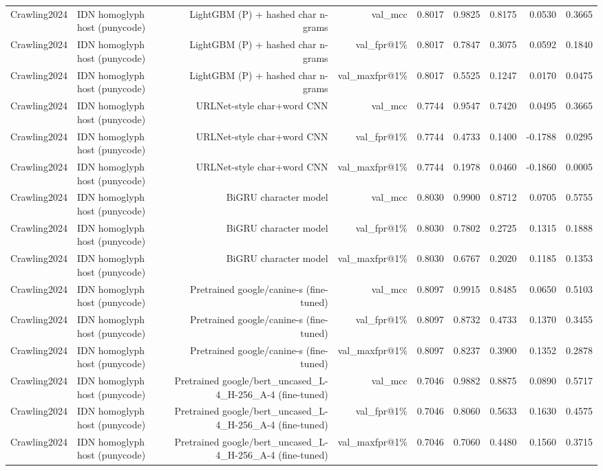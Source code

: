 \begin{table}[t]
\begin{tabular}{llrrrrrrr}
Crawling2024 & IDN homoglyph host (punycode) & LightGBM (P) + hashed char n-grams & val\_mcc & 0.8017 & 0.9825 & 0.8175 & 0.0530 & 0.3665 \\
Crawling2024 & IDN homoglyph host (punycode) & LightGBM (P) + hashed char n-grams & val\_fpr@1\% & 0.8017 & 0.7847 & 0.3075 & 0.0592 & 0.1840 \\
Crawling2024 & IDN homoglyph host (punycode) & LightGBM (P) + hashed char n-grams & val\_maxfpr@1\% & 0.8017 & 0.5525 & 0.1247 & 0.0170 & 0.0475 \\
Crawling2024 & IDN homoglyph host (punycode) & URLNet-style char+word CNN & val\_mcc & 0.7744 & 0.9547 & 0.7420 & 0.0495 & 0.3665 \\
Crawling2024 & IDN homoglyph host (punycode) & URLNet-style char+word CNN & val\_fpr@1\% & 0.7744 & 0.4733 & 0.1400 & -0.1788 & 0.0295 \\
Crawling2024 & IDN homoglyph host (punycode) & URLNet-style char+word CNN & val\_maxfpr@1\% & 0.7744 & 0.1978 & 0.0460 & -0.1860 & 0.0005 \\
Crawling2024 & IDN homoglyph host (punycode) & BiGRU character model & val\_mcc & 0.8030 & 0.9900 & 0.8712 & 0.0705 & 0.5755 \\
Crawling2024 & IDN homoglyph host (punycode) & BiGRU character model & val\_fpr@1\% & 0.8030 & 0.7802 & 0.2725 & 0.1315 & 0.1888 \\
Crawling2024 & IDN homoglyph host (punycode) & BiGRU character model & val\_maxfpr@1\% & 0.8030 & 0.6767 & 0.2020 & 0.1185 & 0.1353 \\
Crawling2024 & IDN homoglyph host (punycode) & Pretrained google/canine-s (fine-tuned) & val\_mcc & 0.8097 & 0.9915 & 0.8485 & 0.0650 & 0.5103 \\
Crawling2024 & IDN homoglyph host (punycode) & Pretrained google/canine-s (fine-tuned) & val\_fpr@1\% & 0.8097 & 0.8732 & 0.4733 & 0.1370 & 0.3455 \\
Crawling2024 & IDN homoglyph host (punycode) & Pretrained google/canine-s (fine-tuned) & val\_maxfpr@1\% & 0.8097 & 0.8237 & 0.3900 & 0.1352 & 0.2878 \\
Crawling2024 & IDN homoglyph host (punycode) & Pretrained google/bert\_uncased\_L-4\_H-256\_A-4 (fine-tuned) & val\_mcc & 0.7046 & 0.9882 & 0.8875 & 0.0890 & 0.5717 \\
Crawling2024 & IDN homoglyph host (punycode) & Pretrained google/bert\_uncased\_L-4\_H-256\_A-4 (fine-tuned) & val\_fpr@1\% & 0.7046 & 0.8060 & 0.5633 & 0.1630 & 0.4575 \\
Crawling2024 & IDN homoglyph host (punycode) & Pretrained google/bert\_uncased\_L-4\_H-256\_A-4 (fine-tuned) & val\_maxfpr@1\% & 0.7046 & 0.7060 & 0.4480 & 0.1560 & 0.3715 \\

\end{tabular}
\end{table}
